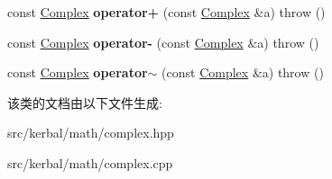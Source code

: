 \begin{DoxyCompactItemize}
const \hyperlink{classkerbal_1_1math_1_1_complex}{Complex} {\bfseries operator+} (const \hyperlink{classkerbal_1_1math_1_1_complex}{Complex} \&a)  throw ()
\item 
\mbox{\label{classkerbal_1_1math_1_1_complex_a16890ada4914501949165ae31d91107f}} 
const \hyperlink{classkerbal_1_1math_1_1_complex}{Complex} {\bfseries operator-\/} (const \hyperlink{classkerbal_1_1math_1_1_complex}{Complex} \&a)  throw ()
\item 
\mbox{\label{classkerbal_1_1math_1_1_complex_a280bc48adc7443f46c01072004292367}} 
const \hyperlink{classkerbal_1_1math_1_1_complex}{Complex} {\bfseries operator$\sim$} (const \hyperlink{classkerbal_1_1math_1_1_complex}{Complex} \&a)  throw ()
\end{DoxyCompactItemize}


该类的文档由以下文件生成\+:\begin{DoxyCompactItemize}
\item 
src/kerbal/math/complex.\+hpp\item 
src/kerbal/math/complex.\+cpp\end{DoxyCompactItemize}
